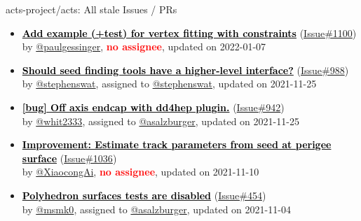 \begin{frame}[allowframebreaks]{ acts-project/acts: All stale Issues / PRs}
\begin{itemize}
    \item\iss\prstale
    \hspace*{0.1em}
    \textbf{\href{https://github.com/acts-project/acts/issues/1100}{\textcolor{black}{Add example (+test) for vertex fitting with constraints}}}
    (\href{https://github.com/acts-project/acts/issues/1100}{Issue\#1100}) \\
    by \href{https://github.com/paulgessinger}{@paulgessinger}, {}\textbf{\textcolor{Red}{no assignee}}, updated on 2022-01-07

    \item\iss\prstale
    \hspace*{0.1em}
    \textbf{\href{https://github.com/acts-project/acts/issues/988}{\textcolor{black}{Should seed finding tools have a higher-level interface?}}}
    (\href{https://github.com/acts-project/acts/issues/988}{Issue\#988}) \\
    by \href{https://github.com/stephenswat}{@stephenswat}, {}assigned to \href{https://github.com/stephenswat}{@stephenswat}, updated on 2021-11-25

    \item\iss\prstale
    \hspace*{0.1em}
    \textbf{\href{https://github.com/acts-project/acts/issues/942}{\textcolor{black}{[bug] Off axis endcap with dd4hep plugin.}}}
    (\href{https://github.com/acts-project/acts/issues/942}{Issue\#942}) \\
    by \href{https://github.com/whit2333}{@whit2333}, {}assigned to \href{https://github.com/asalzburger}{@asalzburger}, updated on 2021-11-25

    \item\iss\prstale
    \hspace*{0.1em}
    \textbf{\href{https://github.com/acts-project/acts/issues/1036}{\textcolor{black}{Improvement: Estimate track parameters from seed at perigee surface}}}
    (\href{https://github.com/acts-project/acts/issues/1036}{Issue\#1036}) \\
    by \href{https://github.com/XiaocongAi}{@XiaocongAi}, {}\textbf{\textcolor{Red}{no assignee}}, updated on 2021-11-10

    \item\iss\prstale
    \hspace*{0.1em}
    \textbf{\href{https://github.com/acts-project/acts/issues/454}{\textcolor{black}{Polyhedron surfaces tests are disabled}}}
    (\href{https://github.com/acts-project/acts/issues/454}{Issue\#454}) \\
    by \href{https://github.com/msmk0}{@msmk0}, {}assigned to \href{https://github.com/asalzburger}{@asalzburger}, updated on 2021-11-04


\end{itemize}
\end{frame}
